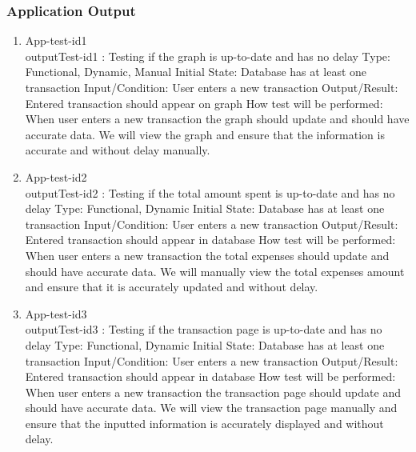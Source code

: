 \documentclass[12pt, titlepage]{article}
\begin{document}
\subsubsection{Application Output}
\begin{enumerate}
\item{App-test-id1\\}
outputTest-id1 : Testing if the graph is up-to-date and has no delay
\newline
Type: Functional, Dynamic, Manual
\newline
Initial State: Database has at least one transaction
\newline
Input/Condition: User enters a new transaction
\newline
Output/Result: Entered transaction should appear on graph
\newline
How test will be performed: When user enters a new transaction the graph should update and should have accurate data. We will view the graph and ensure that the information is accurate and without delay manually.

\item{App-test-id2\\}
outputTest-id2 : Testing if the total amount spent is up-to-date and has no delay
\newline
Type: Functional, Dynamic
\newline
Initial State: Database has at least one transaction
\newline
Input/Condition: User enters a new transaction
\newline
Output/Result: Entered transaction should appear in database
\newline
How test will be performed: When user enters a new transaction the total expenses should update and should have accurate data. We will manually view the total expenses amount and ensure that it is accurately updated and without delay.

\item{App-test-id3\\}
outputTest-id3 : Testing if the transaction page is up-to-date and has no delay
\newline
Type: Functional, Dynamic
\newline
Initial State: Database has at least one transaction
\newline
Input/Condition: User enters a new transaction
\newline
Output/Result: Entered transaction should appear in database
\newline
How test will be performed: When user enters a new transaction the transaction page should update and should have accurate data.  We will view the transaction page manually and ensure that the inputted information is accurately displayed and without delay.

\end{enumerate}
\end{document}
